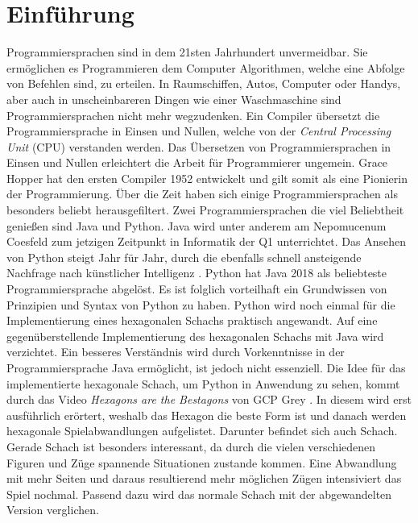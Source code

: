 \chapter{Einführung}
Programmiersprachen sind in dem 21sten Jahrhundert unvermeidbar. Sie ermöglichen es Programmieren dem Computer Algorithmen, welche eine Abfolge von Befehlen sind, zu erteilen. In Raumschiffen, Autos, Computer oder Handys, aber auch in unscheinbareren Dingen wie einer Waschmaschine sind Programmiersprachen nicht mehr wegzudenken. Ein Compiler übersetzt die Programmiersprache in Einsen und Nullen, welche von der \textit{Central Processing Unit} (CPU) verstanden werden. Das Übersetzen von Programmiersprachen in Einsen und Nullen erleichtert die Arbeit für Programmierer ungemein. Grace Hopper hat den ersten Compiler 1952 entwickelt und gilt somit als eine Pionierin der Programmierung. Über die Zeit haben sich einige Programmiersprachen als besonders beliebt herausgefiltert. Zwei Programmiersprachen die viel Beliebtheit genießen sind Java und Python. Java wird unter anderem am Nepomucenum Coesfeld zum jetzigen Zeitpunkt in Informatik der Q1 unterrichtet. Das Ansehen von Python steigt Jahr für Jahr, durch die ebenfalls schnell ansteigende Nachfrage nach künstlicher Intelligenz \cite{Gray:2017}. Python hat Java 2018 als beliebteste Programmiersprache abgelöst. Es ist folglich vorteilhaft ein Grundwissen von Prinzipien und Syntax von Python zu haben. Python wird noch einmal für die Implementierung eines hexagonalen Schachs praktisch angewandt. Auf eine gegenüberstellende Implementierung des hexagonalen Schachs mit Java wird verzichtet. Ein besseres Verständnis wird durch Vorkenntnisse in der Programmiersprache Java ermöglicht, ist jedoch nicht essenziell. Die Idee für das implementierte hexagonale Schach, um Python in Anwendung zu sehen, kommt durch das Video \textit{Hexagons are the Bestagons} von GCP Grey \cite{Grey:Bestagons}. In diesem wird erst ausführlich erörtert, weshalb das Hexagon die beste Form ist und danach werden hexagonale Spielabwandlungen aufgelistet. Darunter befindet sich auch Schach. Gerade Schach ist besonders interessant, da durch die vielen verschiedenen Figuren und Züge spannende Situationen zustande kommen. Eine Abwandlung mit mehr Seiten und daraus resultierend mehr möglichen Zügen intensiviert das Spiel nochmal. Passend dazu wird das normale Schach mit der abgewandelten Version verglichen. \cite{Github:PYPL}\cite{Louis:2010}
